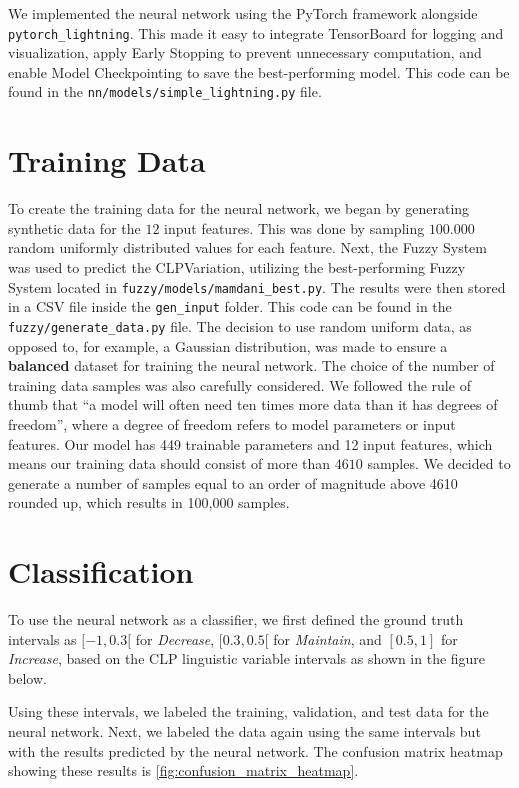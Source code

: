 \documentclass[titlepage]{article}
\begin{document}
We implemented the neural network using the PyTorch framework alongside \newline \texttt{pytorch\_lightning}.
This made it easy to integrate TensorBoard for logging and visualization, apply Early Stopping to prevent unnecessary computation, and enable Model Checkpointing to save the best-performing model.
This code can be found in the \texttt{nn/models/simple\_lightning.py} file.

\section{Training Data}

To create the training data for the neural network, we began by generating synthetic data for the $12$ input features.
This was done by sampling $100.000$ random uniformly distributed values for each feature.
Next, the Fuzzy System was used to predict the CLPVariation, utilizing the best-performing Fuzzy System located in \texttt{fuzzy/models/mamdani\_best.py}.
The results were then stored in a CSV file inside the \texttt{gen\_input} folder.
This code can be found in the \texttt{fuzzy/generate\_data.py} file.
The decision to use random uniform data, as opposed to, for example, a Gaussian distribution, was made to ensure a \textbf{balanced} dataset for training the neural network.
The choice of the number of training data samples was also carefully considered.
We followed the rule of thumb that ``a model will often need ten times more data than it has degrees of freedom'', where a degree of freedom refers to model parameters or input features.
Our model has 449 trainable parameters and 12 input features, which means our training data should consist of more than $4610$ samples.
We decided to generate a number of samples equal to an order of magnitude above 4610 rounded up, which results in 100,000 samples.

\section{Classification}

To use the neural network as a classifier, we first defined the ground truth intervals as \([-1, 0.3[\) for \emph{Decrease}, \([0.3, 0.5[\) for \emph{Maintain}, and \([0.5, 1]\) for \emph{Increase}, based on the CLP linguistic variable intervals as shown in the figure below.

Using these intervals, we labeled the training, validation, and test data for the neural network.
Next, we labeled the data again using the same intervals but with the results predicted by the neural network.
The confusion matrix heatmap showing these results is \vref{fig:confusion_matrix_heatmap}.
\end{document}

